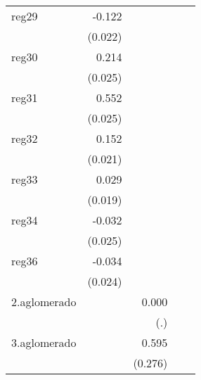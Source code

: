 {\begin{longtable}{l*{4}{D{.}{.}{-1}}}
\addlinespace
reg29       &      -0.122\sym{***}&                     &                     &                     \\
            &     (0.022)         &                     &                     &                     \\
\addlinespace
reg30       &       0.214\sym{***}&                     &                     &                     \\
            &     (0.025)         &                     &                     &                     \\
\addlinespace
reg31       &       0.552\sym{***}&                     &                     &                     \\
            &     (0.025)         &                     &                     &                     \\
\addlinespace
reg32       &       0.152\sym{***}&                     &                     &                     \\
            &     (0.021)         &                     &                     &                     \\
\addlinespace
reg33       &       0.029         &                     &                     &                     \\
            &     (0.019)         &                     &                     &                     \\
\addlinespace
reg34       &      -0.032         &                     &                     &                     \\
            &     (0.025)         &                     &                     &                     \\
\addlinespace
reg36       &      -0.034         &                     &                     &                     \\
            &     (0.024)         &                     &                     &                     \\
\addlinespace
2.aglomerado&                     &       0.000         &                     &                     \\
            &                     &         (.)         &                     &                     \\
\addlinespace
3.aglomerado&                     &       0.595\sym{*}  &                     &                     \\
            &                     &     (0.276)         &                     &                     \\

\end{longtable}}
